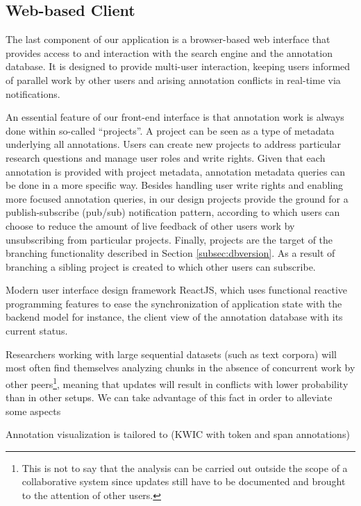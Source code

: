 \documentclass{sig-alternate}
\begin{document}
\subsection{Web-based Client}\label{subsec:client}

The last component of our application is a browser-based web interface that provides access to and
interaction with the search engine and the annotation database. It is designed to provide
multi-user interaction, keeping users informed of parallel work by other users and arising
annotation conflicts in real-time via notifications.

An essential feature of our front-end interface is that annotation work is always done within
so-called ``projects''. A project can be seen as a type of metadata underlying all annotations.
Users can create new projects to address particular research questions and manage user
roles and write rights. Given that each annotation is provided with project metadata,
annotation metadata queries can be done in a more specific way. Besides handling user write
rights and enabling more focused annotation queries, in our design projects provide the ground for a
publish-subscribe (pub/sub) notification pattern, according to which users can choose to
reduce the amount of live feedback of other users work by unsubscribing from particular projects.
Finally, projects are the target of the branching functionality described in Section
\ref{subsec:dbversion}. As a result of branching a sibling project is created to which
other users can subscribe.

Modern user interface design framework ReactJS, which uses functional reactive programming features
to ease the synchronization of application state with the backend model \textemdash for instance,
the client view of the annotation database with its current status.

Researchers working with large sequential datasets (such as text corpora) will most often find
themselves analyzing chunks in the absence of concurrent work by other peers\footnote{
  This is not to say that the analysis can be carried out outside the scope of a collaborative
  system since updates still have to be documented and brought to the attention of other users.
}, meaning that updates will result in conflicts with lower probability than in other setups.
We can take advantage of this fact in order to alleviate some aspects 

Annotation visualization is tailored to (KWIC with token and span annotations)
\end{document}
